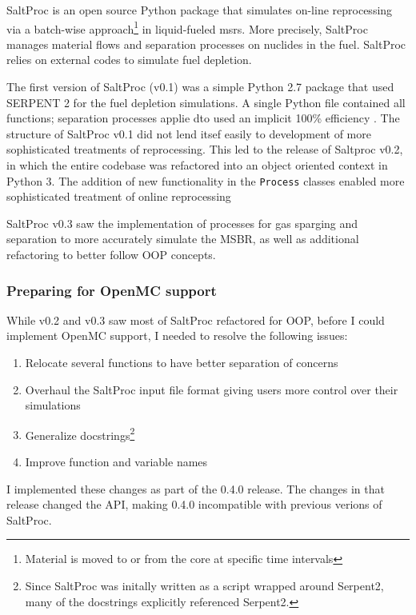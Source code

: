 SaltProc\cite{rykhlevskii_saltproc_2018} is an open source Python package that simulates on-line reprocessing via a batch-wise approach\footnote{Material is moved to or from the core at specific time intervals} in liquid-fueled \Gls{msr}s. More precisely, SaltProc manages material flows and separation processes on nuclides in the fuel. SaltProc relies on external codes to simulate fuel depletion.

The first version of SaltProc (v0.1) was a simple Python 2.7 package that used SERPENT 2 for the fuel depletion simulations. A single Python file contained all functions; separation processes applie dto  used an implicit 100\% efficiency \cite{rykhlevskii_advanced_2018}. The structure of SaltProc v0.1 did not lend itsef easily to development of more sophisticated treatments of reprocessing. This led to the release of Saltproc v0.2, in which the entire codebase was refactored into an object oriented
context in Python 3. The addition of new functionality in the \verb.Process. classes enabled more sophisticated treatment of online reprocessing \cite{rykhlevskii_fuel_2020} 

SaltProc v0.3 saw the implementation of processes for gas sparging and separation to more accurately simulate the MSBR, as well as additional refactoring to better follow OOP concepts.

\subsubsection{Preparing for OpenMC support}%
While v0.2 and v0.3 saw most of SaltProc refactored for OOP, before I could implement OpenMC support, I needed to resolve the following issues:
\begin{enumerate}
    \item Relocate several functions to have better separation of concerns
    \item Overhaul the SaltProc input file format giving users more control over their simulations
    \item Generalize docstrings\footnote{Since SaltProc was initally written as a script wrapped around Serpent2, many of the docstrings explicitly referenced Serpent2.}
    \item Improve function and variable names
\end{enumerate}
I implemented these changes as part of the 0.4.0 release. The changes in that release changed the API, making 0.4.0 incompatible with previous verions of SaltProc.

